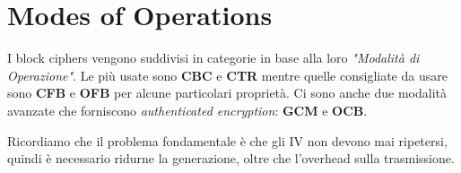 \section{Modes of Operations}
I block ciphers vengono suddivisi in categorie in base alla loro \textit{"Modalità di Operazione"}. Le più usate sono \textbf{CBC} e \textbf{CTR} mentre quelle consigliate da usare sono \textbf{CFB} e \textbf{OFB} per alcune particolari proprietà. Ci sono anche due modalità avanzate che forniscono \textit{authenticated encryption}: \textbf{GCM} e \textbf{OCB}.
\begin{remark}
Ricordiamo che il problema fondamentale è che gli IV non devono mai ripetersi, quindi è necessario ridurne la generazione, oltre che l'overhead sulla trasmissione.
\end{remark}

